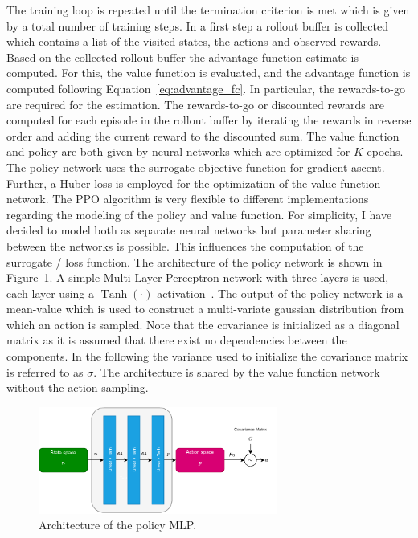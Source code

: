 The training loop is repeated until the termination criterion is met which is given by a total number of training steps.
In a first step a rollout buffer is collected which contains a list of the visited states, the actions and observed rewards.
Based on the collected rollout buffer the advantage function estimate is computed.
For this, the value function is evaluated,  and the advantage function is computed following Equation~\ref{eq:advantage_fc}.
In particular, the rewards-to-go are required for the estimation.
The rewards-to-go or discounted rewards are computed for each episode in the rollout buffer by iterating the rewards
in reverse order and adding the current reward to the discounted sum.
The value function and policy are both given by neural networks which are optimized for $K$ epochs.
The policy network uses the surrogate objective function for gradient ascent.
Further, a Huber loss is employed for the optimization of the value function network.
The PPO algorithm is very flexible to different implementations regarding the modeling of the policy and value function.
For simplicity, I have decided to model both as separate neural networks but parameter sharing between the networks is possible.
This influences the computation of the surrogate / loss function.
The architecture of the policy network is shown in Figure~\ref{fig:policy_mlp}.
A simple Multi-Layer Perceptron network with three layers is used, each layer using a $\operatorname{Tanh}(\cdot)$ activation~\cite{Goodfellow-et-al-2016}.
The output of the policy network is a mean-value which is used to construct a multi-variate gaussian distribution from which an action is sampled.
Note that the covariance is initialized as a diagonal matrix as it is assumed that there exist no dependencies between
the components.
In the following the variance used to initialize the covariance matrix is referred to as $\sigma$.
The architecture is shared by the value function network without the action sampling.
\begin{figure}[t]
    \centering
    \includegraphics[width=0.7\textwidth]{images/presentation/ann_policy_value.pdf}
    \caption{Architecture of the policy MLP.}
    \label{fig:policy_mlp}
\end{figure}
